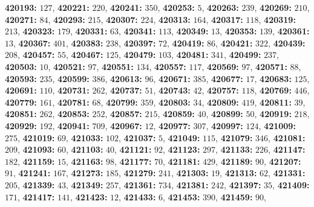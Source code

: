 \textsf{\bfseries 420193:} $127$, \textsf{\bfseries 420221:} $220$, \textsf{\bfseries 420241:} $350$, \textsf{\bfseries 420253:} $5$, \textsf{\bfseries 420263:} $239$, \textsf{\bfseries 420269:} $210$, \textsf{\bfseries 420271:} $84$, \textsf{\bfseries 420293:} $215$, \textsf{\bfseries 420307:} $224$, \textsf{\bfseries 420313:} $164$, \textsf{\bfseries 420317:} $118$, \textsf{\bfseries 420319:} $213$, \textsf{\bfseries 420323:} $179$, \textsf{\bfseries 420331:} $63$, \textsf{\bfseries 420341:} $113$, \textsf{\bfseries 420349:} $13$, \textsf{\bfseries 420353:} $139$, \textsf{\bfseries 420361:} $13$, \textsf{\bfseries 420367:} $401$, \textsf{\bfseries 420383:} $238$, \textsf{\bfseries 420397:} $72$, \textsf{\bfseries 420419:} $86$, \textsf{\bfseries 420421:} $322$, \textsf{\bfseries 420439:} $208$, \textsf{\bfseries 420457:} $55$, \textsf{\bfseries 420467:} $125$, \textsf{\bfseries 420479:} $103$, \textsf{\bfseries 420481:} $341$, \textsf{\bfseries 420499:} $237$, \textsf{\bfseries 420503:} $10$, \textsf{\bfseries 420521:} $97$, \textsf{\bfseries 420551:} $134$, \textsf{\bfseries 420557:} $117$, \textsf{\bfseries 420569:} $97$, \textsf{\bfseries 420571:} $88$, \textsf{\bfseries 420593:} $235$, \textsf{\bfseries 420599:} $386$, \textsf{\bfseries 420613:} $96$, \textsf{\bfseries 420671:} $385$, \textsf{\bfseries 420677:} $17$, \textsf{\bfseries 420683:} $125$, \textsf{\bfseries 420691:} $110$, \textsf{\bfseries 420731:} $262$, \textsf{\bfseries 420737:} $51$, \textsf{\bfseries 420743:} $42$, \textsf{\bfseries 420757:} $118$, \textsf{\bfseries 420769:} $446$, \textsf{\bfseries 420779:} $161$, \textsf{\bfseries 420781:} $68$, \textsf{\bfseries 420799:} $359$, \textsf{\bfseries 420803:} $34$, \textsf{\bfseries 420809:} $419$, \textsf{\bfseries 420811:} $39$, \textsf{\bfseries 420851:} $262$, \textsf{\bfseries 420853:} $252$, \textsf{\bfseries 420857:} $215$, \textsf{\bfseries 420859:} $40$, \textsf{\bfseries 420899:} $50$, \textsf{\bfseries 420919:} $218$, \textsf{\bfseries 420929:} $192$, \textsf{\bfseries 420941:} $709$, \textsf{\bfseries 420967:} $12$, \textsf{\bfseries 420977:} $307$, \textsf{\bfseries 420997:} $124$, \textsf{\bfseries 421009:} $275$, \textsf{\bfseries 421019:} $69$, \textsf{\bfseries 421033:} $102$, \textsf{\bfseries 421037:} $5$, \textsf{\bfseries 421049:} $115$, \textsf{\bfseries 421079:} $346$, \textsf{\bfseries 421081:} $209$, \textsf{\bfseries 421093:} $60$, \textsf{\bfseries 421103:} $40$, \textsf{\bfseries 421121:} $92$, \textsf{\bfseries 421123:} $297$, \textsf{\bfseries 421133:} $226$, \textsf{\bfseries 421147:} $182$, \textsf{\bfseries 421159:} $15$, \textsf{\bfseries 421163:} $98$, \textsf{\bfseries 421177:} $70$, \textsf{\bfseries 421181:} $429$, \textsf{\bfseries 421189:} $90$, \textsf{\bfseries 421207:} $91$, \textsf{\bfseries 421241:} $167$, \textsf{\bfseries 421273:} $185$, \textsf{\bfseries 421279:} $241$, \textsf{\bfseries 421303:} $19$, \textsf{\bfseries 421313:} $62$, \textsf{\bfseries 421331:} $205$, \textsf{\bfseries 421339:} $43$, \textsf{\bfseries 421349:} $257$, \textsf{\bfseries 421361:} $734$, \textsf{\bfseries 421381:} $242$, \textsf{\bfseries 421397:} $35$, \textsf{\bfseries 421409:} $171$, \textsf{\bfseries 421417:} $141$, \textsf{\bfseries 421423:} $12$, \textsf{\bfseries 421433:} $6$, \textsf{\bfseries 421453:} $390$, \textsf{\bfseries 421459:} $90$, 
